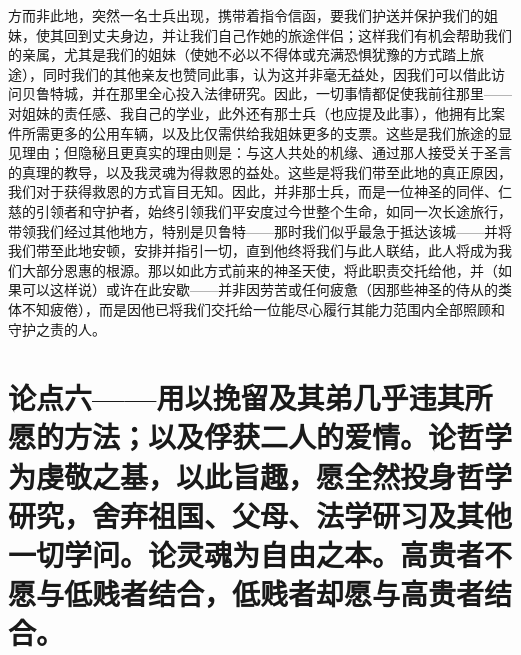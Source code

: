 方而非此地，突然一名士兵出现，携带着指令信函，要我们护送并保护我们的姐妹，使其回到丈夫身边，并让我们自己作她的旅途伴侣；这样我们有机会帮助我们的亲属，尤其是我们的姐妹（使她不必以不得体或充满恐惧犹豫的方式踏上旅途），同时我们的其他亲友也赞同此事，认为这并非毫无益处，因我们可以借此访问贝鲁特城，并在那里全心投入法律研究。因此，一切事情都促使我前往那里——对姐妹的责任感、我自己的学业，此外还有那士兵（也应提及此事），他拥有比案件所需更多的公用车辆，以及比仅需供给我姐妹更多的支票。这些是我们旅途的显见理由；但隐秘且更真实的理由则是：与这人共处的机缘、通过那人接受关于圣言的真理的教导，以及我灵魂为得救恩的益处。这些是将我们带至此地的真正原因，我们对于获得救恩的方式盲目无知。因此，并非那士兵，而是一位神圣的同伴、仁慈的引领者和守护者，始终引领我们平安度过今世整个生命，如同一次长途旅行，带领我们经过其他地方，特别是贝鲁特——那时我们似乎最急于抵达该城——并将我们带至此地安顿，安排并指引一切，直到他终将我们与此人联结，此人将成为我们大部分恩惠的根源。那以如此方式前来的神圣天使，将此职责交托给他，并（如果可以这样说）或许在此安歇——并非因劳苦或任何疲惫（因那些神圣的侍从的类体不知疲倦），而是因他已将我们交托给一位能尽心履行其能力范围内全部照顾和守护之责的人。\par


\section{论点六——用以挽留及其弟几乎违其所愿的方法；以及俘获二人的爱情。论哲学为虔敬之基，以此旨趣，愿全然投身哲学研究，舍弃祖国、父母、法学研习及其他一切学问。论灵魂为自由之本。高贵者不愿与低贱者结合，低贱者却愿与高贵者结合。}

